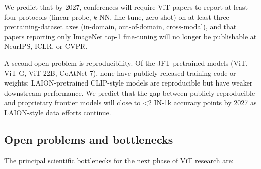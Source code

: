We predict that by 2027, conferences will require ViT papers to report at least four protocols (linear probe, \(k\)-NN, fine-tune, zero-shot) on at least three pretraining-dataset axes (in-domain, out-of-domain, cross-modal), and that papers reporting only ImageNet top-1 fine-tuning will no longer be publishable at NeurIPS, ICLR, or CVPR.

A second open problem is reproducibility. Of the JFT-pretrained models (ViT, ViT-G, ViT-22B, CoAtNet-7), none have publicly released training code or weights; LAION-pretrained CLIP-style models are reproducible but have weaker downstream performance. We predict that the gap between publicly reproducible and proprietary frontier models will close to \textless2 IN-1k accuracy points by 2027 as LAION-style data efforts continue.

\subsection{Open problems and bottlenecks}\label{open-problems-and-bottlenecks}

The principal scientific bottlenecks for the next phase of ViT research are:

